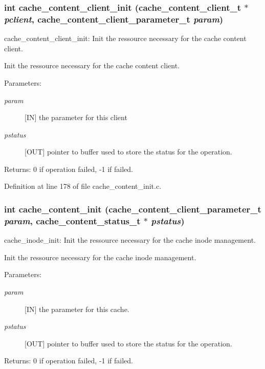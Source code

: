 \subsubsection[{cache\_\-content\_\-client\_\-init}]{\setlength{\rightskip}{0pt plus 5cm}int cache\_\-content\_\-client\_\-init (cache\_\-content\_\-client\_\-t $\ast$ {\em pclient}, \/  cache\_\-content\_\-client\_\-parameter\_\-t {\em param})}\label{cache__content__init_8c_fa9637b135c1e70734fcaaf042583824}


cache\_\-content\_\-client\_\-init: Init the ressource necessary for the cache content client.

Init the ressource necessary for the cache content client.

\begin{Desc}
\item[Parameters:]
\begin{description}
\item[{\em param}][IN] the parameter for this client \item[{\em pstatus}][OUT] pointer to buffer used to store the status for the operation.\end{description}
\end{Desc}
\begin{Desc}
\item[Returns:]0 if operation failed, -1 if failed. \end{Desc}


Definition at line 178 of file cache\_\-content\_\-init.c.
\subsubsection[{cache\_\-content\_\-init}]{\setlength{\rightskip}{0pt plus 5cm}int cache\_\-content\_\-init (cache\_\-content\_\-client\_\-parameter\_\-t {\em param}, \/  cache\_\-content\_\-status\_\-t $\ast$ {\em pstatus})}\label{cache__content__init_8c_24a42a2805937468b2828d2835f52050}


cache\_\-inode\_\-init: Init the ressource necessary for the cache inode management.

Init the ressource necessary for the cache inode management.

\begin{Desc}
\item[Parameters:]
\begin{description}
\item[{\em param}][IN] the parameter for this cache. \item[{\em pstatus}][OUT] pointer to buffer used to store the status for the operation.\end{description}
\end{Desc}
\begin{Desc}
\item[Returns:]0 if operation failed, -1 if failed. \end{Desc}


